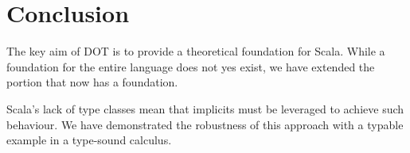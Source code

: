 \section{Conclusion}

The key aim of DOT is to provide a theoretical foundation for Scala. While a
foundation for the entire language does not yes exist, we have extended the
portion that now has a foundation.

Scala's lack of type classes mean that implicits must be leveraged to achieve
such behaviour. We have demonstrated the robustness of this approach with a
typable example in a type-sound calculus.
